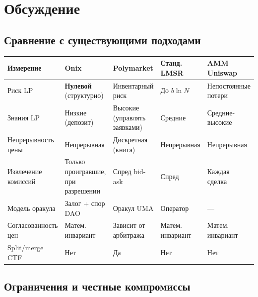 \documentclass{ledger}
\theoremstyle{plain}
\theoremstyle{remark}
\begin{document}
\section{Обсуждение}\label{sec:discussion}

\subsection{Сравнение с существующими подходами}

\begin{center}
\begin{tabular}{lllll}
\hline
\textbf{Измерение} & \textbf{Onix} & \textbf{Polymarket} & \textbf{Станд. LMSR} & \textbf{AMM Uniswap} \\
\hline
Риск LP & \textbf{Нулевой} (структурно) & Инвентарный риск & До $b \ln N$ & Непостоянные потери \\
Знания LP & Низкие (депозит) & Высокие (управлять заявками) & Средние & Средние-высокие \\
Непрерывность цены & Непрерывная & Дискретная (книга) & Непрерывная & Непрерывная \\
Извлечение комиссий & Только проигравшие, при разрешении & Спред bid-ask & Спред & Каждая сделка \\
Модель оракула & Залог + спор DAO & Оракул UMA & Оператор & --- \\
Согласованность цен & Матем. инвариант & Зависит от арбитража & Матем. инвариант & Матем. инвариант \\
Split/merge CTF & Нет & Да & Нет & Нет \\
\hline
\end{tabular}
\end{center}

\subsection{Ограничения и честные компромиссы}\label{sec:limitations}
\end{document}
